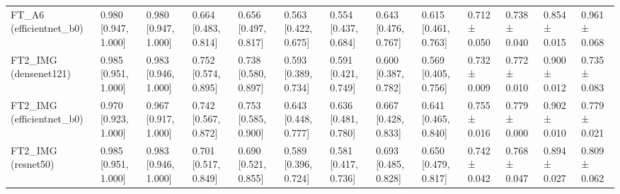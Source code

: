 \begin{table}
\begin{tabular}{lllllllllllll}
FT\_A6 (efficientnet\_b0) & 0.980 [0.947, 1.000] & 0.980 [0.947, 1.000] & 0.664 [0.483, 0.814] & 0.656 [0.497, 0.817] & 0.563 [0.422, 0.675] & 0.554 [0.437, 0.684] & 0.643 [0.476, 0.767] & 0.615 [0.461, 0.763] & 0.712 ± 0.050 & 0.738 ± 0.040 & 0.854 ± 0.015 & 0.961 ± 0.068 \\
FT2\_IMG (densenet121) & 0.985 [0.951, 1.000] & 0.983 [0.946, 1.000] & 0.752 [0.574, 0.895] & 0.738 [0.580, 0.897] & 0.593 [0.389, 0.734] & 0.591 [0.421, 0.749] & 0.600 [0.387, 0.782] & 0.569 [0.405, 0.756] & 0.732 ± 0.009 & 0.772 ± 0.010 & 0.900 ± 0.012 & 0.735 ± 0.083 \\
FT2\_IMG (efficientnet\_b0) & 0.970 [0.923, 1.000] & 0.967 [0.917, 1.000] & 0.742 [0.567, 0.872] & 0.753 [0.585, 0.900] & 0.643 [0.448, 0.777] & 0.636 [0.481, 0.780] & 0.667 [0.428, 0.833] & 0.641 [0.465, 0.840] & 0.755 ± 0.016 & 0.779 ± 0.000 & 0.902 ± 0.010 & 0.779 ± 0.021 \\
FT2\_IMG (resnet50) & 0.985 [0.951, 1.000] & 0.983 [0.946, 1.000] & 0.701 [0.517, 0.849] & 0.690 [0.521, 0.855] & 0.589 [0.396, 0.724] & 0.581 [0.417, 0.736] & 0.693 [0.485, 0.828] & 0.650 [0.479, 0.817] & 0.742 ± 0.042 & 0.768 ± 0.047 & 0.894 ± 0.027 & 0.809 ± 0.062 \\
\bottomrule
\end{tabular}
\end{table}
